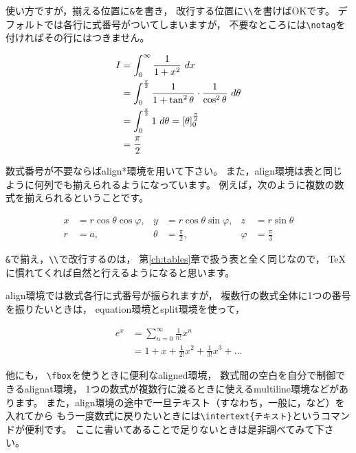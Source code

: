 \documentclass[class=jreport, crop=false, preview=false, dvipdfmx, fleqn]{standalone}
\begin{document}
使い方ですが，揃える位置に\verb|&|を書き，
改行する位置に\verb|\\|を書けばOKです。
デフォルトでは各行に式番号がついてしまいますが，
不要なところには\verb|\notag|を付ければその行にはつきません。

\begin{IOTeX*}
\begin{align}
I & = \int_0^{\infty} \frac{1}{1 + x^2} \ dx \\
  & = \int_0^{\frac{\pi}{2}} \frac{1}{1 + \tan^2 \theta} \cdot \frac{1}{\cos^2 \theta} \ d\theta \\
  & = \int_0^{\frac{\pi}{2}} 1 \ d\theta = \left[ \theta \right]_0^{\frac{\pi}{2}} \notag \\
  & = \frac{\pi}{2}
\end{align}
\end{IOTeX*}

数式番号が不要ならばalign*環境を用いて下さい。
また，align環境は表と同じように何列でも揃えられるようになっています。
例えば，次のように複数の数式を揃えられるということです。
\begin{IOTeX*}
\begin{align*}
x & = r \cos\theta \cos\varphi, & y & = r \cos\theta \sin\varphi, & z & = r \sin\theta \\
r & = a, & \theta & = \frac{\pi}{2}, & \varphi & = \frac{\pi}{3}
\end{align*}
\end{IOTeX*}

\verb|&|で揃え，\verb|\\|で改行するのは，
第\ref{ch:tables}章で扱う表と全く同じなので，
{\TeX}に慣れてくれば自然と行えるようになると思います。

align環境では数式各行に式番号が振られますが，
複数行の数式全体に1つの番号を振りたいときは，
equation環境とsplit環境を使って，
\begin{IOTeX}
\begin{equation}
  \begin{split}
    e^x & = \sum_{n=0}^{\infty} \frac{1}{n!} x^n \\
      & = 1 + x + \frac{1}{2!} x^2 + \frac{1}{3!} x^3 + \dots 
  \end{split}
\end{equation}
\end{IOTeX}

他にも，
\verb|\fbox|を使うときに便利なaligned環境，
数式間の空白を自分で制御できるalignat環境，
1つの数式が複数行に渡るときに使えるmultiline環境などがあります。
また，align環境の途中で一旦テキスト（すなわち，一般に，など）を入れてから
もう一度数式に戻りたいときには\verb|\intertext{テキスト}|というコマンドが便利です。
ここに書いてあることで足りないときは是非調べてみて下さい。
\end{document}
